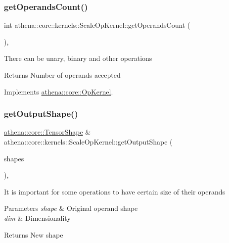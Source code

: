 \subsubsection{\texorpdfstring{get\+Operands\+Count()}{getOperandsCount()}}
{\footnotesize\ttfamily int athena\+::core\+::kernels\+::\+Scale\+Op\+Kernel\+::get\+Operands\+Count (\begin{DoxyParamCaption}{ }\end{DoxyParamCaption})\hspace{0.3cm}{\ttfamily [override]}, {\ttfamily [virtual]}}

There can be unary, binary and other operations \begin{DoxyReturn}{Returns}
Number of operands accepted 
\end{DoxyReturn}


Implements \mbox{\hyperlink{classathena_1_1core_1_1_op_kernel_add97d4c132d80ecd9915acfedf7c9119}{athena\+::core\+::\+Op\+Kernel}}.

\mbox{\label{classathena_1_1core_1_1kernels_1_1_scale_op_kernel_afdd5df13d53df932af26968714a2beed}} 
\subsubsection{\texorpdfstring{get\+Output\+Shape()}{getOutputShape()}}
{\footnotesize\ttfamily \mbox{\hyperlink{classathena_1_1core_1_1_tensor_shape}{athena\+::core\+::\+Tensor\+Shape}} \& athena\+::core\+::kernels\+::\+Scale\+Op\+Kernel\+::get\+Output\+Shape (\begin{DoxyParamCaption}\item[{const std\+::vector$<$ \mbox{\hyperlink{classathena_1_1core_1_1_tensor_shape}{athena\+::core\+::\+Tensor\+Shape}} \& $>$ \&}]{shapes }\end{DoxyParamCaption})\hspace{0.3cm}{\ttfamily [override]}, {\ttfamily [virtual]}}

It is important for some operations to have certain size of their operands 
\begin{DoxyParams}{Parameters}
{\em shape} & Original operand shape \\
\hline
{\em dim} & Dimensionality \\
\hline
\end{DoxyParams}
\begin{DoxyReturn}{Returns}
New shape 
\end{DoxyReturn}



